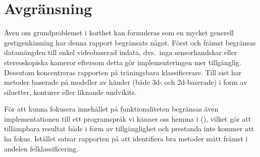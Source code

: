 \documentclass[../rapport_MVEX01-11-05]{subfiles}
\begin{document}
\section{Avgränsning}

Även om grundproblemet i korthet kan formuleras som en mycket generell
gestigenkänning har denna rapport begränsats något. Först och främst
begränsas datamängden till enkel videobaserad indata, dvs.~inga sensorhandskar
eller stereoskopiska kameror eftersom detta gör implementeringen mer
tillgänglig. Dessutom koncentreras rapporten på träningsbara
klassificerare. Till sist har metoder baserade på modeller av händer (både
3d- och 2d-baserade) i form av siluetter, konturer eller liknande undvikits.

För att kunna fokusera innehållet på funktionaliteten begränsas även
implementationen till ett programspråk vi känner oss hemma i (\MATLAB), vilket gör att
tillämpbara resultat både i form av tillgänglighet och prestanda inte kommer
att ha fokus. Istället satsar rapporten på att identifiera bra metoder mätt
främst i andelen felklassificering.

\end{document}
